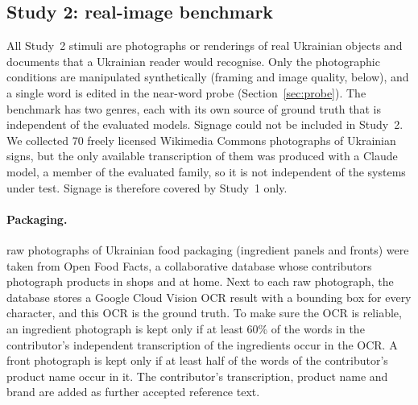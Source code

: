 \subsection{Study 2: real-image benchmark}\label{sec:stimuli}

All Study~2 stimuli are photographs or renderings of real Ukrainian objects and documents that a Ukrainian reader would recognise. Only the photographic conditions are manipulated synthetically (framing and image quality, below), and a single word is edited in the near-word probe (Section~\ref{sec:probe}). The benchmark has two genres, each with its own source of ground truth that is independent of the evaluated models. Signage could not be included in Study~2. We collected 70 freely licensed Wikimedia Commons photographs of Ukrainian signs, but the only available transcription of them was produced with a Claude model, a member of the evaluated family, so it is not independent of the systems under test. Signage is therefore covered by Study~1 only.

\paragraph{Packaging.} \NPack{} raw photographs of Ukrainian food packaging (ingredient panels and fronts) were taken from Open Food Facts, a collaborative database whose contributors photograph products in shops and at home. Next to each raw photograph, the database stores a Google Cloud Vision OCR result with a bounding box for every character, and this OCR is the ground truth. To make sure the OCR is reliable, an ingredient photograph is kept only if at least 60\% of the words in the contributor's independent transcription of the ingredients occur in the OCR. A front photograph is kept only if at least half of the words of the contributor's product name occur in it. The contributor's transcription, product name and brand are added as further accepted reference text.

